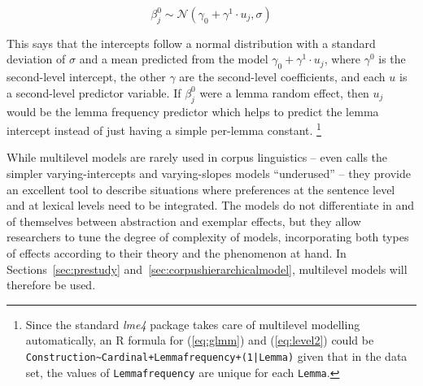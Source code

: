 \begin{equation}
  \beta^0_j\sim\mathcal{N}(\gamma_0+\gamma^1\cdot u_j, \sigma)
  \label{eq:level2}
\end{equation}

This says that the intercepts follow a normal distribution with a standard deviation of $\sigma$ and a mean predicted from the model $\gamma_0+\gamma^1\cdot u_j$, where $\gamma^0$ is the second-level intercept, the other $\gamma$ are the second-level coefficients, and each $u$ is a second-level predictor variable.
If $\beta^0_{j}$ were a lemma random effect, then $u_j$ would be the lemma frequency predictor which helps to predict the lemma intercept instead of just having a simple per-lemma constant.%
\footnote{Since the standard \textit{lme4} package takes care of multilevel modelling automatically, an R formula for (\ref{eq:glmm}) and (\ref{eq:level2}) could be \texttt{Construction\textasciitilde Cardinal+Lemmafrequency+(1|Lemma)} given that in the data set, the values of \texttt{Lemmafrequency} are unique for each \texttt{Lemma}.}

While multilevel models are rarely used in corpus linguistics -- \citet{Gries2015} even calls the simpler varying-intercepts and varying-slopes models ``underused'' -- they provide an excellent tool to describe situations where preferences at the sentence level and at lexical levels need to be integrated.
The models do not differentiate in and of themselves between abstraction and exemplar effects, but they allow researchers to tune the degree of complexity of models, incorporating both types of effects according to their theory and the phenomenon at hand.
In Sections~\ref{sec:prestudy} and~\ref{sec:corpushierarchicalmodel}, multilevel models will therefore be used.
